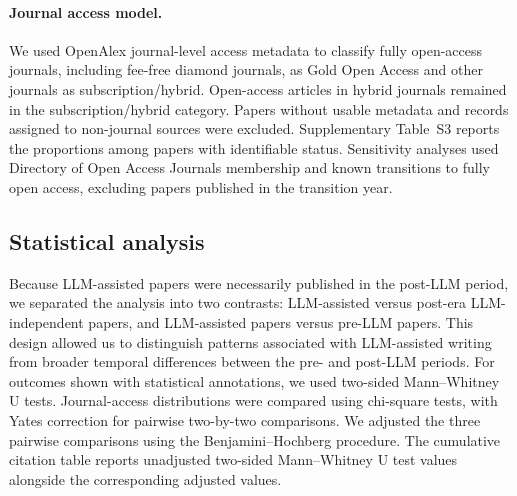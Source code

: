 \paragraph{Journal access model.} We used OpenAlex journal-level access metadata to classify fully open-access journals, including fee-free diamond journals, as Gold Open Access and other journals as subscription/hybrid. Open-access articles in hybrid journals remained in the subscription/hybrid category. Papers without usable metadata and records assigned to non-journal sources were excluded. Supplementary Table~S3 reports the proportions among papers with identifiable status. Sensitivity analyses used Directory of Open Access Journals membership and known transitions to fully open access, excluding papers published in the transition year.

\subsection*{Statistical analysis}

Because LLM-assisted papers were necessarily published in the post-LLM period, we separated the analysis into two contrasts: LLM-assisted versus post-era LLM-independent papers, and LLM-assisted papers versus pre-LLM papers. This design allowed us to distinguish patterns associated with LLM-assisted writing from broader temporal differences between the pre- and post-LLM periods. For outcomes shown with statistical annotations, we used two-sided Mann--Whitney U tests\cite{mann1947test}. Journal-access distributions were compared using chi-square tests, with Yates correction for pairwise two-by-two comparisons. We adjusted the three pairwise comparisons using the Benjamini--Hochberg procedure. The cumulative citation table reports unadjusted two-sided Mann--Whitney U test values alongside the corresponding adjusted values.

